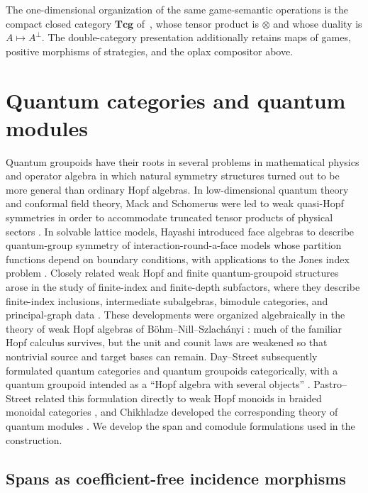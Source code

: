 \documentclass[oneside]{article}
\theoremstyle{plain}
\theoremstyle{definition}
\theoremstyle{remark}
\begin{document}
The one-dimensional organization of the same game-semantic operations is the compact closed category \(\mathbf{Tcg}\) of~\cite[Thm.~3.37]{CastellanClairambaultWinskel2019}, whose tensor product is \(\otimes\) and whose duality is \(A\mapsto A^\perp\). The double-category presentation additionally retains maps of games, positive morphisms of strategies, and the oplax compositor above.

\section{Quantum categories and quantum modules}
\label{sec:quantum-categories-and-quantum-modules}

Quantum groupoids have their roots in several problems in mathematical physics and
operator algebra in which natural symmetry structures turned out to be more general
than ordinary Hopf algebras. In low-dimensional quantum theory and conformal field
theory, Mack and Schomerus were led to weak quasi-Hopf symmetries in order to
accommodate truncated tensor products of physical sectors
\cite{MackSchomerus1992}. In solvable lattice models, Hayashi introduced face
algebras to describe quantum-group symmetry of interaction-round-a-face models
whose partition functions depend on boundary conditions, with applications to the
Jones index problem \cite{Hayashi1993,Hayashi1998}. Closely related weak Hopf and
finite quantum-groupoid structures arose in the study of finite-index and
finite-depth subfactors, where they describe finite-index inclusions,
intermediate subalgebras, bimodule categories, and principal-graph data
\cite{NikshychVainerman2000,NikshychVainerman2002}. These
developments were organized algebraically in the theory of weak Hopf algebras of
Böhm--Nill--Szlachányi \cite{BohmNillSzlachanyi1999}: much of the familiar Hopf
calculus survives, but the unit and counit laws are weakened so that nontrivial
source and target bases can remain. Day--Street subsequently formulated quantum
categories and quantum groupoids categorically, with a quantum groupoid intended
as a ``Hopf algebra with several objects'' \cite{DayStreet2004}. Pastro--Street
related this formulation directly to weak Hopf monoids in braided monoidal
categories \cite{PastroStreet2009}, and Chikhladze developed the corresponding
theory of quantum modules \cite{Chikhladze2010QuantumModules}. We develop the span and comodule formulations used in the construction.

\subsection{Spans as coefficient-free incidence morphisms}
\end{document}
